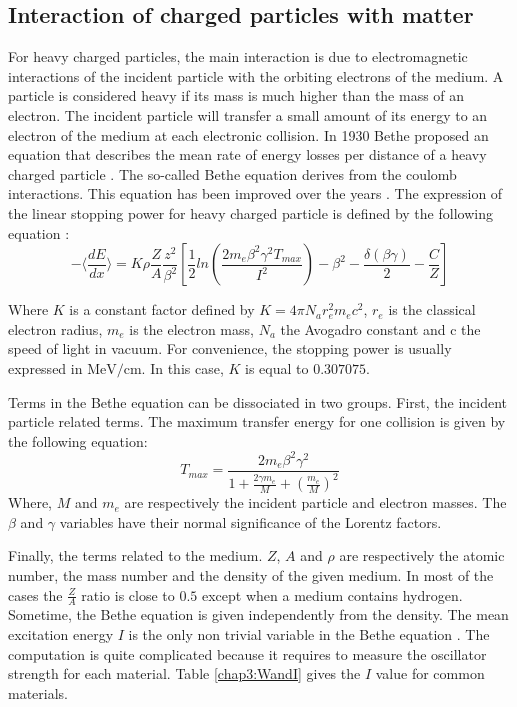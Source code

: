 \begin{refsection}
  \subsection{Interaction of charged particles with matter}
  For heavy charged particles, the main interaction is due to electromagnetic interactions of the incident particle with the orbiting electrons of the medium. A particle is considered heavy if its mass is much higher than the mass of an electron. The incident particle will transfer a small amount of its energy to an electron of the medium at each electronic collision. In 1930 Bethe proposed an equation that describes the mean rate of energy losses per distance of a heavy charged particle \cite[]{Bethe1930}. The so-called Bethe equation derives from the coulomb interactions. This equation has been improved over the years \cite{Bloch1933,Fermi1940,Fano1963}. The expression of the linear stopping power for heavy charged particle is defined by the following equation \cite[p. 446]{Tanabashi2018}:
  \begin{equation}
    - \bigg \langle \frac{dE}{dx} \bigg \rangle =K \rho \frac{Z}{A} \frac{z^{2}}{\beta^{2}} \left[\frac{1}{2} ln \left(\frac{2 m_{e} \beta^{2} \gamma^{2} T_{max}}{I^{2}} \right) - \beta^{2} - \frac{\delta(\beta \gamma)}{2} - \frac{C}{Z} \right]
  \end{equation}

  Where \(K\) is a constant factor defined by \(K=4 \pi N_{a} r_{e}^{2} m_{e} c^{2}\), \(r_{e}\) is the classical electron radius, \(m_{e}\) is the electron mass, \(N_{a}\) the Avogadro constant and c the speed of light in vacuum. For convenience, the stopping power is usually expressed in \(\mathrm{MeV/cm}\). In this case, \(K\) is equal to \(0.307075\).

  Terms in the Bethe equation can be dissociated in two groups. First, the incident particle related terms. The maximum transfer energy for one collision is given by the following equation:
  \begin{equation}
    T_{max} = \frac{2 m_{e} \beta^{2} \gamma^{2}}{1 + \frac{2 \gamma m_{e} }{M} + \left( \frac{m_{e}}{M} \right)^{2}}
  \end{equation}
  Where, \(M\) and \(m_{e}\) are respectively the incident particle and electron masses. The \(\beta\) and \(\gamma\) variables have their normal significance of the Lorentz factors.

  Finally, the terms related to the medium. \(Z\), \(A\) and \(\rho\) are respectively the atomic number, the mass number and the density of the given medium. In most of the cases the \(\frac{Z}{A}\) ratio is close to \(0.5\) except when a medium contains hydrogen. Sometime, the Bethe equation is given independently from the density.
  The mean excitation energy \(I\) is the only non trivial variable in the Bethe equation \cite{Berger1984,Berger1993}. The computation is quite complicated because it requires to measure  the oscillator strength for each material. Table \ref{chap3:WandI} gives the \(I\) value for common materials.


\end{refsection}
